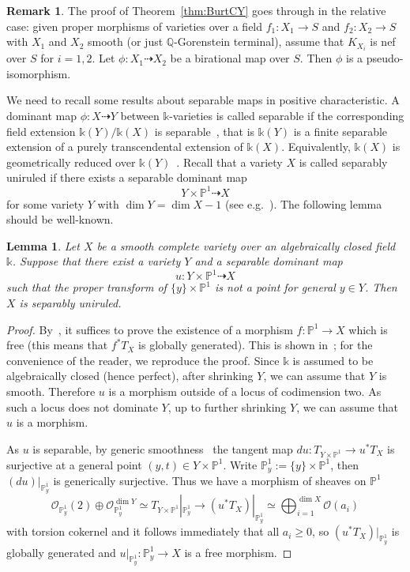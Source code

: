 \documentclass[a4paper,12pt]{amsart}
\def\k{\mathbb k}
\def\P{\mathbb P}
\def\Q{\mathbb Q}
\theoremstyle{plain}
\newtheorem{lem}[dummy]{Lemma}
\numberwithin{equation}{section}
\theoremstyle{definition}
\newtheorem{remark}[dummy]{Remark}
\newcommand{\cO}{\mathcal{O}}
\newcommand{\cnec}{\mathrel{:=}}
\renewcommand{\(}{\left(}
\renewcommand{\)}{\right)}
\newcommand{\dto}{\dashrightarrow}
\begin{document}
\begin{remark}\label{rem:burt}
The proof of Theorem~\ref{thm:BurtCY} 
goes through in the relative case: given proper morphisms of varieties over a field $f_1: X_1 \to S$ and $f_2: X_2 \to S$ 
with $X_1$ and $X_2$ smooth (or just $\Q$-Gorenstein
terminal),
assume 
that
$K_{X_i}$ is nef over $S$ for $i = 1, 2$.
Let $\phi: X_1 \dto X_2$
be a birational map over $S$.
Then $\phi$ is a pseudo-isomorphism.
\end{remark}



We need to recall some results about separable maps in positive characteristic.
A dominant map $\phi: X \dto Y$ between $\k$-varieties 
is called separable if the
corresponding field extension $\k(Y)/\k(X)$
is separable~\cite[\href{https://stacks.math.columbia.edu/tag/030I}{Tag 030I}]{stacks-project},
that is $\k(Y)$ is a finite
separable extension of a purely transcendental extension of
$\k(X)$. 
Equivalently,
$\k(X)$ is geometrically
reduced over $\k(Y)$~\cite[\href{https://stacks.math.columbia.edu/tag/05DT}{Tag 05DT}]{stacks-project}.
Recall that a variety $X$ is called separably uniruled
if there exists a 
separable
dominant map
$$Y \times \P^1 \dto X$$
for some variety $Y$ with $\dim Y = \dim X - 1$
(see e.g.~\cite[Definition IV.1.1]{Kollarrat}).
The following lemma should be well-known.

\begin{lem}\label{lem-defSU}
Let $X$ be a smooth complete variety over an algebraically closed field $\k$.
Suppose that there exist a variety $Y$ and
a separable dominant map
$$u: Y \times \P^1 \dto X$$
such that the proper transform of $\{y\} \times \P^1$ 
is not a point for general $y \in Y$.
Then $X$ is separably uniruled.
\end{lem}

\begin{proof}
By~\cite[Theorem IV.1.9]{Kollarrat},
it suffices to prove the existence of a
morphism
$f : \P^1 \to X$
which is free (this means that $f^*T_X$
is globally generated).
This is shown in~\cite[Lemma 1.2]{MR977778};
for the convenience of the reader, we reproduce the proof.
Since $\k$ is assumed
to be algebraically closed
(hence perfect), after shrinking $Y$, we can assume that $Y$ is smooth.
Therefore $u$ is a morphism outside of a locus of codimension two.
As such a locus does not dominate $Y$,
up to further shrinking $Y$, 
we can assume that $u$ is a morphism.

As $u$ is separable, by generic smoothness~\cite[\href{https://stacks.math.columbia.edu/tag/056V}{Tag 056V}]{stacks-project}
the tangent map $du : T_{Y \times \P^1} \to u^*T_X$
is surjective at a general point $(y,t) \in Y \times \P^1$.
Write $\P^1_y \cnec \{y\} \times \P^1$, then
$(du)|_{\P_y^1}$ is generically surjective.
Thus
we have 
a morphism of sheaves on $\P^1$
\[
\cO_{\P_y^1}(2) \oplus \cO_{\P_y^1}^{\dim Y} \simeq
T_{Y \times \P^1}|_{\P^1_y}  \longrightarrow 
(u^*T_X)|_{\P^1_y} \simeq
\bigoplus_{i = 1}^{\dim X} \cO(a_i)
\]
with torsion cokernel
and it follows immediately
that
all 
$a_i \ge 0$, so 
$(u^*T_X)|_{\P^1_y}$ 
is globally generated 
and $u|_{\P^1_y} : \P^1_y \to X$ is a free morphism.
\end{proof}
\end{document}

